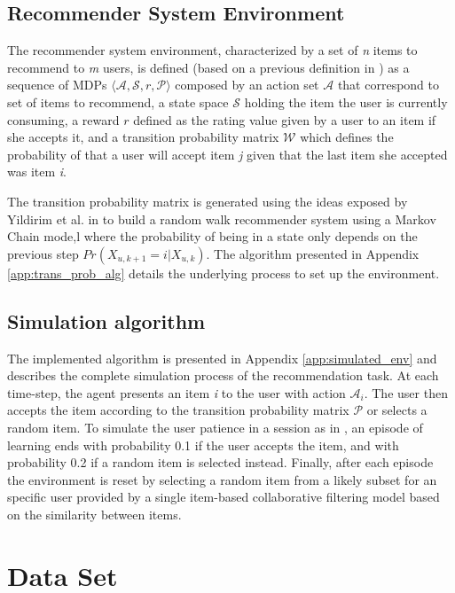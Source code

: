 \subsection{Recommender System Environment}

The recommender system environment, characterized by a set of \textit{n} items to recommend to \textit{m} users, is defined (based on a previous definition in \cite{Dulac-Arnold2015}) as a sequence of MDPs $\langle \mathcal{A}, \mathcal{S}, r, \mathcal{P} \rangle$ composed by an action set $\mathcal{A}$ that correspond to set of items to recommend, a state space $\mathcal{S}$ holding the item the user is currently consuming, a reward $r$ defined as the rating value given by a user to an item if she accepts it, and a transition probability matrix $\mathcal{W}$ which defines the probability of that a user will accept item \textit{j} given that the last item she accepted was item \textit{i}. 

The transition probability matrix is generated using the ideas exposed by Yildirim et al. in \cite{yildirim2008random} to build a random walk recommender system using a Markov Chain mode,l where the probability of being in a state only depends on the previous step $Pr(X_{u, k+1} = i | X_{u, k})$. The algorithm presented in Appendix \ref{app:trans_prob_alg} details the underlying process to set up the environment.

\subsection {Simulation algorithm}

The implemented algorithm is presented in Appendix \ref{app:simulated_env} and describes the complete simulation process of the recommendation task. At each time-step, the agent presents an item \textit{i} to the user with action $\mathcal{A}_i$. The user then accepts the item according to the transition probability matrix $\mathcal{P}$ or selects a random item. To simulate the user patience in a session as in \cite{Dulac-Arnold2015}, an episode of learning ends with probability 0.1 if the user accepts the item, and with probability 0.2 if a random item is selected instead. Finally, after each episode the environment is reset by selecting a random item from a likely subset for an specific user provided by a single item-based collaborative filtering model based on the similarity between items.

\section{Data Set}

